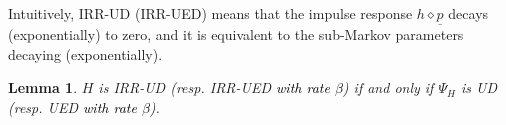 \documentclass[journal,twoside,web]{ieeecolor}
\newtheorem{Lemma}[Theorem]{Lemma}
\begin{document}
  Intuitively, IRR-UD (IRR-UED) means that the impulse response $h \diamond \underline{p}$ decays (exponentially) 
  to zero, and it is equivalent to the sub-Markov parameters decaying (exponentially).
  \begin{Lemma}
  \label{lem:lpv:IRR-UD}
  $H$ is IRR-UD (resp. IRR-UED \textcolor{black}{with rate $\beta$}) if and only if $\Psi_H$ is UD 
  (resp. UED \textcolor{black}{with rate $\beta$}). %
  \end{Lemma}
\end{document}
